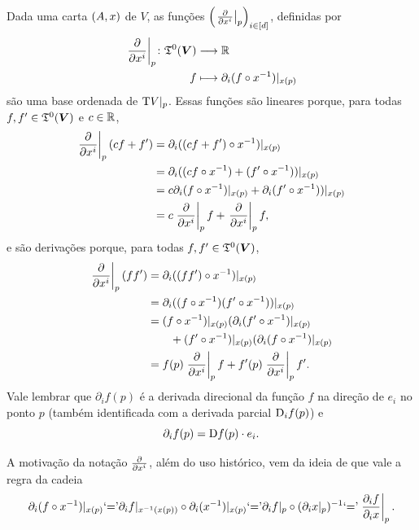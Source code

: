 Dada uma carta $(A,x)$ de $V$, as funções $\left( \left.{\frac{\partial{}}{\partial{x^i}}}\right|_p \right)_{i \in [d]}$, definidas por
	\begin{align*}
	{\left.{\frac{\partial{}}{\partial{x^i}}}\right|_p}\colon {\mathfrak{T}^0(\bm V)} &\longrightarrow {\mathbb{R}} \\{f} &\longmapsto \partial_i(f \circ x^{-1})|_{x(p)}
	\end{align*}
são uma base ordenada de $\mathrm{T} V|_p$. Essas funções são lineares porque, para todas $f,f' \in \mathfrak{T}^0(\bm V)$ e $c \in \mathbb{R}$,
	\begin{align*}
	\left.{\frac{\partial{}}{\partial{x^i}}}\right|_p(cf+f') &= \partial_i((cf+f') \circ x^{-1})|_{x(p)} \\
		&= \partial_i((cf \circ x^{-1}) + (f' \circ x^{-1}))|_{x(p)} \\
		&= c\partial_i(f \circ x^{-1})|_{x(p)} + \partial_i(f' \circ x^{-1}))|_{x(p)} \\
		&= c\left.{\frac{\partial{}}{\partial{x^i}}}\right|_p f + \left.{\frac{\partial{}}{\partial{x^i}}}\right|_p f,
	\end{align*}
e são derivações porque, para todas $f,f' \in \mathfrak{T}^0(\bm V)$,
	\begin{align*}
	\left.{\frac{\partial{}}{\partial{x^i}}}\right|_p(ff') &= \partial_i ((ff') \circ x^{-1})|_{x(p)} \\
		&= \partial_i ((f \circ x^{-1})(f' \circ x^{-1}))|_{x(p)} \\
		&= (f \circ x^{-1})|_{x(p)}(\partial_i (f' \circ x^{-1})|_{x(p)} \\
		&\qquad + (f' \circ x^{-1})|_{x(p)}(\partial_i (f \circ x^{-1})|_{x(p)} \\
		&= f(p)\left.{\frac{\partial{}}{\partial{x^i}}}\right|_p f +  f'(p)\left.{\frac{\partial{}}{\partial{x^i}}}\right|_p f'.
	\end{align*}
Vale lembrar que $\partial_i f(p)$ é a derivada direcional da função $f$ na direção de $e_i$ no ponto $p$ (também identificada com a derivada parcial $\mathrm{D}_i f(p)$) e
	\begin{equation*}
	\partial_i f(p) = \mathrm{D} f(p) \cdot e_i.
	\end{equation*}

A motivação da notação $\frac{\partial{}}{\partial{x^i}}$, além do uso histórico, vem da ideia de que vale a regra da cadeia
	\begin{align*}
	\partial_i(f \circ x^{-1})|_{x(p)} \text{`='} \partial_i f|_{x^{-1}(x(p))} \circ \partial_i(x^{-1})|_{x(p)} \text{`='} \partial_i f|_p \circ (\partial_i x|_p)^{-1} \text{`='} \left.\frac{\partial_i f}{\partial_i x}\right|_p.
	\end{align*}

